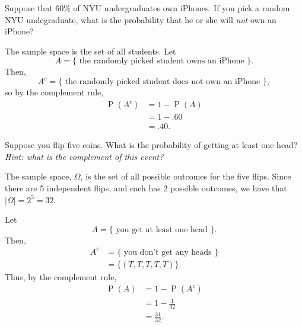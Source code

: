 \documentclass[11pt]{exam}
\DeclareMathOperator*{\Prob}{P}
\renewcommand{\Pr}{\Prob}
\begin{document}
\begin{questions}
\begin{parts}
\end{parts}



\newpage



\question Suppose that 60\% of NYU undergraduates own iPhones.  If you pick a
random NYU undegraduate, what is the probability that he or she will \emph{not} own
an iPhone?

\begin{solution}
The sample space is the set of all students.  Let
\[
  A = \{ \text{ the randomly picked student owns an iPhone } \}.
\]
Then,
\[
  A^c = \{ \text{ the randomly picked student does not own an iPhone } \},
\]
so by the complement rule,
\begin{align*}
  \Pr(A^c) &= 1 - \Pr(A) \\
           &= 1 - .60 \\
           &= .40.
\end{align*}
\end{solution}



\question Suppose you flip five coins.  What is the probability of getting at
least one head?
\\
\textit{Hint: what is the complement of this event?}

\begin{solution}
The sample space, $\Omega$, is the set of all possible outcomes for the five flips.
Since there are 5 independent flips, and each has 2 possible outcomes, we have
that $|\Omega| = 2^5 = 32$.

Let
\[
  A = \{ \text{ you get at least one head } \}.
\]
Then,
\begin{align*}
  A^c &= \{ \text{ you don't get any heads } \} \\
      &= \{ (T,T,T,T,T) \}.
\end{align*}
Thus, by the complement rule,
\begin{align*}
  \Pr(A) &= 1 - \Pr(A^c) \\
         &= 1 - \tfrac{1}{32} \\
         &= \tfrac{31}{32}.
\end{align*}
\end{solution}




\end{questions}
\end{document}

